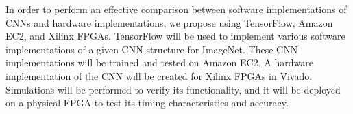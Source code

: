 In order to perform an effective comparison between software implementations of CNNs and hardware implementations, we propose using TensorFlow, Amazon EC2, and Xilinx FPGAs. TensorFlow will be used to implement various software implementations of a given CNN structure for ImageNet. These CNN implementations will be trained and tested on Amazon EC2. A hardware implementation of the CNN will be created for Xilinx FPGAs in Vivado. Simulations will be performed to verify its functionality, and it will be deployed on a physical FPGA to test its timing characteristics and accuracy.